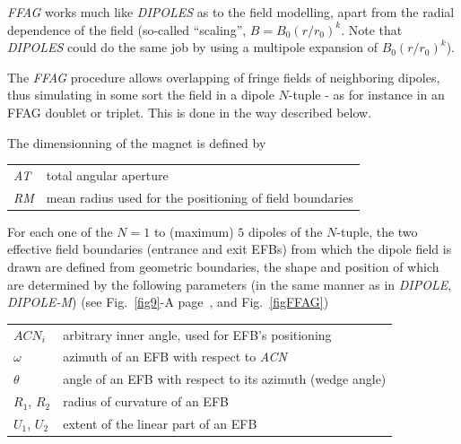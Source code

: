 \noindent \textsl{FFAG} works much like \textsl{DIPOLES} 
as to the field modelling, apart from the  radial dependence of the field (so-called ``scaling'', 
$B=B_0(r/r_0)^k$. Note that \textsl{DIPOLES} could do the same job by using a 
multipole expansion of $B_0(r/r_0)^k$). 

\bigskip

\noindent The \textsl{FFAG} procedure allows overlapping of fringe fields of neighboring dipoles, 
thus simulating in some sort the field in a dipole $N$-tuple - as for instance in an FFAG doublet 
or triplet. This is done in the way described below. 

\bigskip

\noindent  The dimensionning of the magnet is defined by

\bigskip

 \begin{tabular}{>{\sl}l!{~:}l}
	 AT &  total angular aperture \\
	 RM & mean radius used for the positioning of field boundaries\\
 \end{tabular}

\bigskip

\noindent For each one of the $N=1$ to (maximum) $5$ dipoles of the  $N$-tuple, 
the two  effective field boundaries (entrance and exit EFBs) from which  the dipole field  is drawn are
defined from geometric boundaries, the shape and position of which are determined by the 
following parameters (in the same manner as in \textsl{DIPOLE}, \textsl{DIPOLE-M})
 (see Fig.~\ref{fig9}-A page~\pageref{fig9}, and Fig.~\ref{figFFAG}) 

\bigskip

\begin{tabular}{l!{~:}l}
	$ACN_i$  & arbitrary inner angle, used for EFB's positioning  \\
	$\omega$ &  azimuth of an EFB with respect to  \textsl{ACN}\\
	$\theta$ & angle of an EFB with respect to its azimuth (wedge angle)\\ 
	$R_1$, $R_2$  &  radius of curvature of an EFB\\
	$U_1$, $U_2$  &  extent of the linear part of an EFB  \\
\end{tabular}

